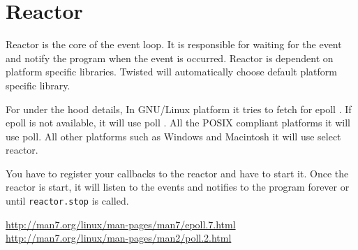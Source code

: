 \documentclass{article}
\begin{document}
  \section{Reactor}
  Reactor is the core of the event loop. It is responsible for waiting for the
  event and notify the program when the event is occurred. Reactor is dependent
  on platform specific libraries. Twisted will automatically choose default
  platform specific library.

  For under the hood details, In GNU/Linux platform it tries to fetch for epoll
  \cite{epoll}.  If epoll \cite{epoll} is not available, it will use poll
  \cite{poll}. All the POSIX compliant platforms it will use poll. All other
  platforms such as Windows and Macintosh it will use select reactor.

  You have to register your callbacks to the reactor and have to start it. Once
  the reactor is start, it will listen to the events and notifies to the
  program forever or until \texttt{reactor.stop} is called.

  \begin{thebibliography}{2}
      \url{http://man7.org/linux/man-pages/man7/epoll.7.html}%
      \url{http://man7.org/linux/man-pages/man2/poll.2.html}%
  \end{thebibliography}
\end{document}
